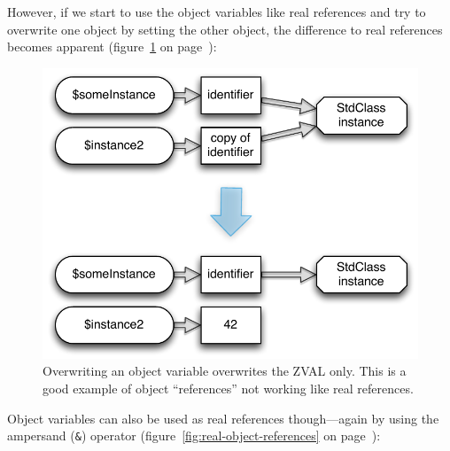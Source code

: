 However, if we start to use the object variables like real references and try to overwrite one object by setting the other object, the difference to real references becomes apparent (figure~\ref{fig:false-object-references} on page~\pageref{fig:false-object-references}):



\begin{figure}[htb]
  \begin{center}
    \includegraphics[scale=0.8]{images/someInstance_instance2}
    \caption{Overwriting an object variable overwrites the ZVAL only. This is a good example of object ``references'' not working like real references.}
    \label{fig:false-object-references}
  \end{center}
\end{figure}

Object variables can also be used as real references though---again by using the ampersand (\texttt{\&}) operator (figure~\ref{fig:real-object-references} on page~\pageref{fig:real-object-references}):

